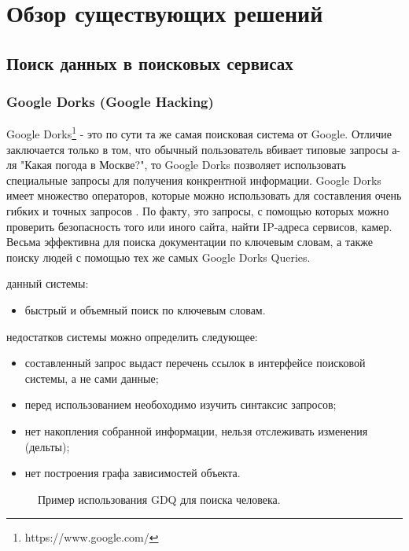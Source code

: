 \section{Обзор существующих решений}
\label{sec:Chapter2} 
\subsection{Поиск данных в поисковых сервисах}
\subsubsection{Google Dorks (Google Hacking)}
Google Dorks\footnote{https://www.google.com/} - это по сути та же самая поисковая система от Google. Отличие заключается
только в том, что обычный пользователь вбивает типовые запросы а-ля "Какая погода в Москве?", то Google Dorks позволяет
использовать специальные запросы для получения конкрентной информации. Google Dorks имеет множество операторов, которые 
можно использовать для составления очень гибких и точных запросов \cite{googleHackingWikipedia}. По факту, это запросы, с помощью которых можно проверить
безопасность того или иного сайта, найти IP-адреса сервисов, камер. Весьма эффективна для поиска документации по ключевым словам, 
а также поиску людей с помощью тех же самых Google Dorks Queries. 

 данный системы:
\begin{itemize}
    \item быстрый и объемный поиск по ключевым словам.
\end{itemize}

 недостатков системы можно определить следующее:
\begin{itemize}
    \item составленный запрос выдаст перечень ссылок в интерфейсе поисковой системы, а не сами данные;
    \item перед использованием необоходимо изучить синтаксис запросов;
    \item нет накопления собранной информации, нельзя отслеживать изменения (дельты);
    \item нет построения графа зависимостей объекта.
\end{itemize}

\begin{figure}[H]
    \caption{Пример использования GDQ для поиска человека.}
    \label{ris:image}
\end{figure}

